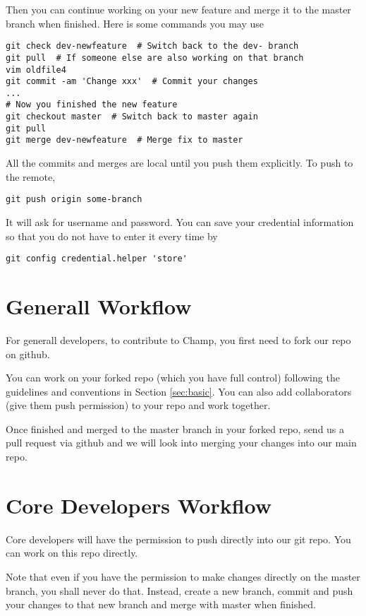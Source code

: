 \documentclass[runningheads,letterpaper]{llncs}
\begin{document}
Then you can continue working on your new feature and merge it to the master branch when finished.
Here is some commands you may use
\begin{verbatim}
git check dev-newfeature  # Switch back to the dev- branch
git pull  # If someone else are also working on that branch
vim oldfile4
git commit -am 'Change xxx'  # Commit your changes
...
# Now you finished the new feature
git checkout master  # Switch back to master again
git pull
git merge dev-newfeature  # Merge fix to master
\end{verbatim}

All the commits and merges are local until you push them explicitly.
To push to the remote,
\begin{verbatim}
git push origin some-branch
\end{verbatim}
It will ask for username and password.
You can save your credential information so that you do not have to enter it every time by
\begin{verbatim}
git config credential.helper 'store'
\end{verbatim}

\section{Generall Workflow}

For generall developers, to contribute to Champ, you first need to fork our repo on github.

You can work on your forked repo (which you have full control) following the guidelines and conventions in Section \ref{sec:basic}.
You can also add collaborators (give them push permission) to your repo and work together.

Once finished and merged to the master branch in your forked repo, send us a pull request via github and we will look into merging your changes into our main repo.

\section{Core Developers Workflow}

Core developers will have the permission to push directly into our git repo.
You can work on this repo directly.

Note that even if you have the permission to make changes directly on the master branch, you shall never do that.
Instead, create a new branch, commit and push your changes to that new branch and merge with master when finished.
\end{document}

